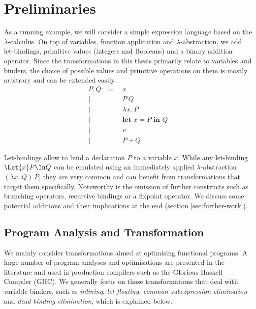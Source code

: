 \chapter{Preliminaries}
\label{ch:preliminaries}
    As a running example, we will consider a simple expression language
    based on the $\lambda$-calculus.
    On top of variables, function application and $\lambda$-abstraction,
    we add let-bindings, primitive values (integers and Booleans) and a binary addition operator.
    Since the transformations in this thesis primarily relate to variables and binders,
    the choice of possible values and primitive operations on them is mostly arbitrary and can be extended easily.
    \begin{align*}
      P, Q ::=&\ x
      \\ \big|&\ P\ Q
      \\ \big|&\ \lambda x.\ P
      \\ \big|&\ \textbf{let } x = P \textbf{ in } Q
      \\ \big|&\ v
      \\ \big|&\ P + Q
    \end{align*}

    Let-bindings allow to bind a declaration $P$ to a variable $x$.
    While any let-binding $\Let{x} P \In Q$ can be emulated
    using an immediately applied $\lambda$-abstraction $(\lambda x.\ Q)\ P$,
    they are very common and can benefit
    from transformations that target them specifically.
    Noteworthy is the omission of further constructs
    such as branching operators, recursive bindings or a fixpoint operator.
    We discuss some potential additions and their implications
    at the end (section \ref{sec:further-work}).

\section{Program Analysis and Transformation}
\label{sec:program-transformations}
    We mainly consider transformations aimed at optimising functional programs.
    A large number of program analyses and optimisations are presented in the literature
    \cite{Nielson1999PrinciplesProgramAnalysis}
    \cite{Santos1995CompilationByTransformation}
    and used in production compilers such as the Glorious Haskell Compiler (GHC).
    We generally focus on those transformations that deal with variable binders,
    such as
    \emph{inlining},
    \emph{let-floating},
    \emph{common subexpression elimination} and
    \emph{dead binding elimination},
    which is explained below.
